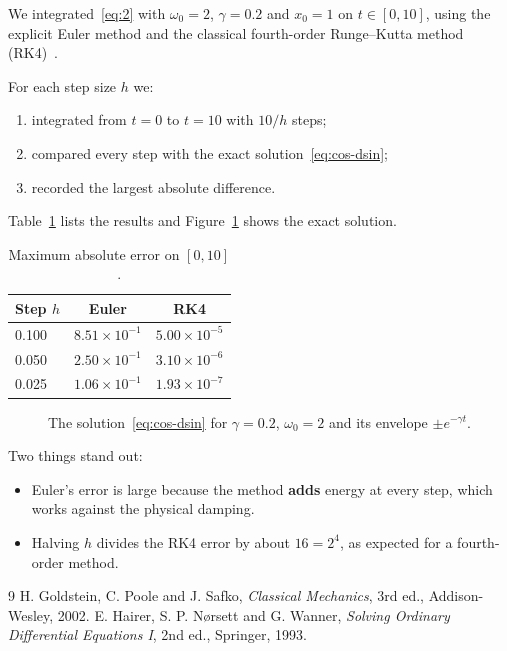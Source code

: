 \documentclass[11pt,a4paper]{article}
\begin{document}
We integrated~\eqref{eq:2} with $\omega_{0}=2$, $\gamma=0.2$ and $x_{0}=1$ on $t\in[0,10]$, using the explicit Euler method and the classical fourth-order Runge--Kutta method (RK4)~\cite{ref2}.

For each step size $h$ we:
\begin{enumerate}
  \item integrated from $t=0$ to $t=10$ with $10/h$ steps;
  \item compared every step with the exact solution~\eqref{eq:cos-dsin};
  \item recorded the largest absolute difference.
\end{enumerate}
Table~\ref{tab:maximum-absolute} lists the results and Figure~\ref{fig:the-solution} shows the exact solution.

\begin{table}[htbp]
  \centering
  \caption{Maximum absolute error on $[0,10]$.}
  \label{tab:maximum-absolute}
  \begin{tabular}{lcc}
    \toprule
    \textbf{Step $h$} & \textbf{Euler} & \textbf{RK4} \\
    \midrule
    0.100 & $8.51\times10^{-1}$ & $5.00\times10^{-5}$ \\
    0.050 & $2.50\times10^{-1}$ & $3.10\times10^{-6}$ \\
    0.025 & $1.06\times10^{-1}$ & $1.93\times10^{-7}$ \\
    \bottomrule
  \end{tabular}
\end{table}

\begin{figure}[htbp]
  \centering
  \caption{The solution~\eqref{eq:cos-dsin} for $\gamma=0.2$, $\omega_{0}=2$ and its envelope $\pm e^{-\gamma t}$.}
  \label{fig:the-solution}
\end{figure}

Two things stand out:
\begin{itemize}
  \item Euler's error is large because the method \textbf{adds} energy at every step, which works against the physical damping.
  \item Halving $h$ divides the RK4 error by about $16=2^{4}$, as expected for a fourth-order method.
\end{itemize}

\begin{thebibliography}{9}
 H. Goldstein, C. Poole and J. Safko, \emph{Classical Mechanics}, 3rd ed., Addison-Wesley, 2002.
 E. Hairer, S. P. Nørsett and G. Wanner, \emph{Solving Ordinary Differential Equations I}, 2nd ed., Springer, 1993.
\end{thebibliography}
\end{document}

